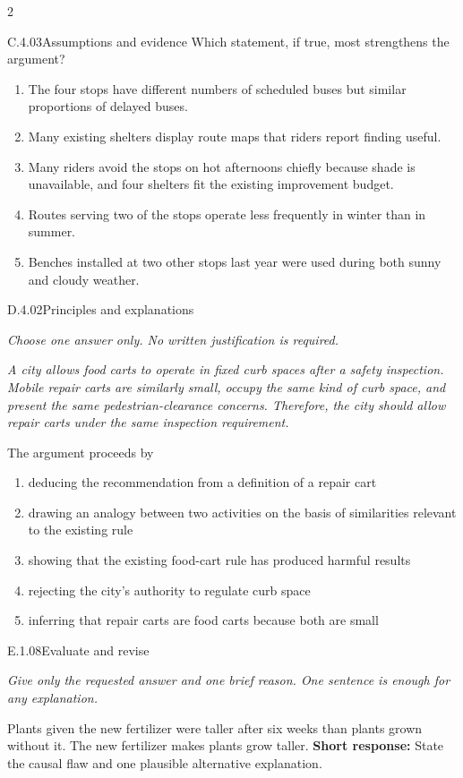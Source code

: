 \documentclass[9pt]{extarticle}
\newcommand{\choice}[1]{\item #1}
\begin{document}
\begin{multicols}{2}
\begin{DenseCoreProblem}{C.4.03}{Assumptions and evidence}
Which statement, if true, most strengthens the argument?
\begin{enumerate}[label=(\alph*)]
  \choice{The four stops have different numbers of scheduled buses but similar proportions of delayed buses.}
  \choice{Many existing shelters display route maps that riders report finding useful.}
  \choice{Many riders avoid the stops on hot afternoons chiefly because shade is unavailable, and four shelters fit the existing improvement budget.}
  \choice{Routes serving two of the stops operate less frequently in winter than in summer.}
  \choice{Benches installed at two other stops last year were used during both sunny and cloudy weather.}
\end{enumerate}
\end{DenseCoreProblem}
\begin{DenseCoreProblem}{D.4.02}{Principles and explanations}
{\scriptsize\textit{Choose one answer only. No written justification is required.}\par}
\emph{A city allows food carts to operate in fixed curb spaces after a safety inspection. Mobile repair carts are similarly small, occupy the same kind of curb space, and present the same pedestrian-clearance concerns. Therefore, the city should allow repair carts under the same inspection requirement.}

The argument proceeds by
\begin{enumerate}[label=(\alph*)]
  \choice{deducing the recommendation from a definition of a repair cart}
  \choice{drawing an analogy between two activities on the basis of similarities relevant to the existing rule}
  \choice{showing that the existing food-cart rule has produced harmful results}
  \choice{rejecting the city's authority to regulate curb space}
  \choice{inferring that repair carts are food carts because both are small}
\end{enumerate}
\end{DenseCoreProblem}
\begin{DenseCoreProblem}{E.1.08}{Evaluate and revise}
{\scriptsize\textit{Give only the requested answer and one brief reason. One sentence is enough for any explanation.}\par}
Plants given the new fertilizer were taller after six weeks than plants grown without it. The new fertilizer makes plants grow taller.
\textbf{Short response:} State the causal flaw and one plausible alternative explanation.
\end{DenseCoreProblem}
\end{multicols}
\end{document}

